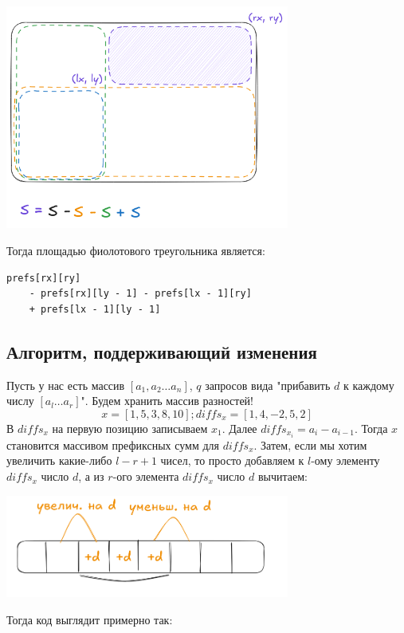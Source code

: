 \documentclass[a4paper,12pt]{article}
\begin{document}
\begin{center}
	\includegraphics[width=0.7\textwidth]{../assets/submatrixsum.png}
\end{center}

Тогда площадью фиолотового треугольника является: \begin{verbatim}
prefs[rx][ry]
    - prefs[rx][ly - 1] - prefs[lx - 1][ry]
    + prefs[lx - 1][ly - 1]
\end{verbatim}

\subsection{Алгоритм, поддерживающий изменения}
Пусть у нас есть массив $[a_1, a_2 \dots a_n]$, $q$ запросов вида
"прибавить $d$ к каждому числу $[a_l \dots a_r]$".
Будем хранить массив разностей!
\[
	x = [1, 5, 3, 8, 10];
	diffs_x = [1, 4, -2, 5, 2]
\]
В $diffs_x$ на первую позицию записываем $x_1$.
Далее $diffs_{x_i} = a_i - a_{i-1}$.
Тогда $x$ становится массивом префиксных сумм для $diffs_x$.
Затем, если мы хотим увеличить какие-либо $l - r + 1$ чисел,
то просто добавляем к $l$-ому элементу $diffs_x$ число $d$, а из
$r$-ого элемента $diffs_x$ число $d$ вычитаем:
\begin{center}
	\includegraphics[width=0.7\textwidth]{../assets/diffarray.png}
\end{center}

Тогда код выглядит примерно так:
\end{document}
